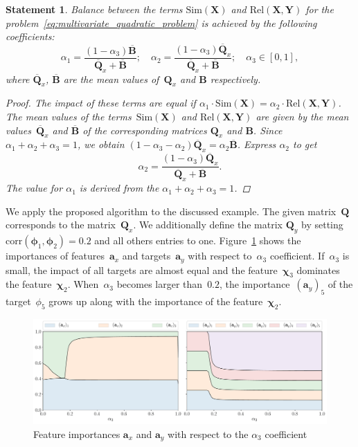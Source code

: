 \documentclass[12pt,twoside]{article}
\newtheorem{statement}{Statement}
\newcommand{\ba}{\mathbf{a}}
\newcommand{\bY}{\mathbf{Y}}
\newcommand{\bX}{\mathbf{X}}
\newcommand{\bB}{\mathbf{B}}
\newcommand{\bQ}{\mathbf{Q}}
\newcommand{\bchi}{\boldsymbol{\chi}}
\newcommand{\bphi}{\boldsymbol{\phi}}
\begin{document}
\begin{statement}
	Balance between the terms $\text{Sim}(\bX)$ and $\text{Rel}(\bX, \bY)$ for the problem~\eqref{eq:multivariate_quadratic_problem} is achieved by the following coefficients:
	\[
		\alpha_1 = \frac{(1 - \alpha_3)\overline{\bB}}{\overline{\bQ}_x + \overline{\bB}}; \quad
		\alpha_2 = \frac{(1 - \alpha_3)\overline{\bQ}_x}{\overline{\bQ}_x + \overline{\bB}}; \quad
		\alpha_3 \in [0, 1],
	\]
	where $\overline{\bQ}_x$, $\overline{\bB}$ are the mean values of~$\bQ_x$ and $\bB$ respectively.
\begin{proof}
	The impact of these terms are equal if $\alpha_1 \cdot \text{Sim}(\bX)= \alpha_2 \cdot \text{Rel}(\bX, \bY)$. 
	The mean values of the terms~$\text{Sim}(\bX)$ and $\text{Rel}(\bX, \bY)$ are given by the mean values~$\overline{\bQ}_x$ and $\overline{\bB}$ of the corresponding matrices $\bQ_x$ and $\bB$.
	Since $\alpha_1 + \alpha_2 + \alpha_3 = 1$, we obtain $(1 - \alpha_3 - \alpha_2) \overline{\bQ}_x = \alpha_2 \overline{\bB}$. 
	Express $\alpha_2$ to get
	\[
		\alpha_2 = \frac{(1 - \alpha_3)\overline{\bQ}_x}{\overline{\bQ}_x + \overline{\bB}}.
	\]
	The value for $\alpha_1$ is derived from the $\alpha_1 + \alpha_2 + \alpha_3 = 1$.
\end{proof}
\end{statement}

We apply the proposed algorithm to the discussed example.
The given matrix~$\bQ$ corresponds to the matrix~$\bQ_x$. 
We additionally define the matrix $\bQ_y$ by setting $\text{corr}(\bphi_1, \bphi_2) = 0.2$ and all others entries to one. 
Figure~\ref{fig:features_vs_alpha} shows the importances of features~$\ba_x$ and targets~$\ba_y$ with respect to~$\alpha_3$ coefficient. 
If~$\alpha_3$ is small, the impact of all targets are almost equal and the feature~$\bchi_3$ dominates the feature~$\bchi_2$. When~$\alpha_3$ becomes larger than~$0.2$, the importance~$(\ba_y)_5$ of the target~$\phi_5$ grows up along with the importance of the feature~$\bchi_2$. 

\begin{figure}
	\centering
	\includegraphics[width=\linewidth]{figs/features_vs_alpha.pdf}
	\caption{Feature importances $\ba_x$ and $\ba_y$ with respect to the $\alpha_3$ coefficient}
	\label{fig:features_vs_alpha}
\end{figure}
\end{document}
